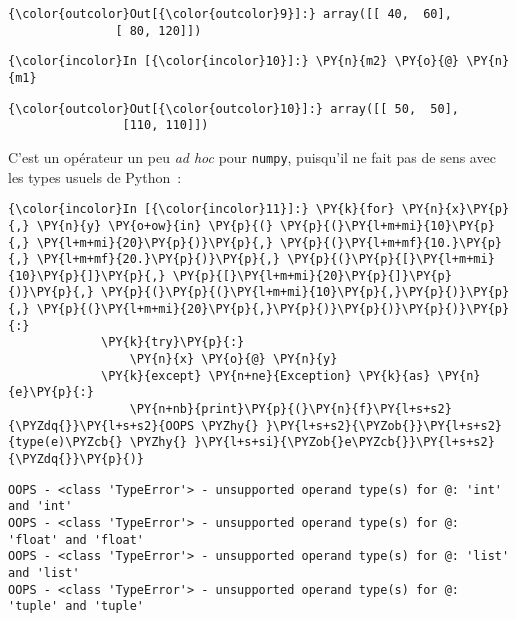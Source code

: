 \begin{Verbatim}[commandchars=\\\{\}]
{\color{outcolor}Out[{\color{outcolor}9}]:} array([[ 40,  60],
               [ 80, 120]])
\end{Verbatim}
            
    \begin{Verbatim}[commandchars=\\\{\}]
{\color{incolor}In [{\color{incolor}10}]:} \PY{n}{m2} \PY{o}{@} \PY{n}{m1}
\end{Verbatim}


\begin{Verbatim}[commandchars=\\\{\}]
{\color{outcolor}Out[{\color{outcolor}10}]:} array([[ 50,  50],
                [110, 110]])
\end{Verbatim}
            
    C'est un opérateur un peu \emph{ad hoc} pour \texttt{numpy}, puisqu'il
ne fait pas de sens avec les types usuels de Python~:

    \begin{Verbatim}[commandchars=\\\{\}]
{\color{incolor}In [{\color{incolor}11}]:} \PY{k}{for} \PY{n}{x}\PY{p}{,} \PY{n}{y} \PY{o+ow}{in} \PY{p}{(} \PY{p}{(}\PY{l+m+mi}{10}\PY{p}{,} \PY{l+m+mi}{20}\PY{p}{)}\PY{p}{,} \PY{p}{(}\PY{l+m+mf}{10.}\PY{p}{,} \PY{l+m+mf}{20.}\PY{p}{)}\PY{p}{,} \PY{p}{(}\PY{p}{[}\PY{l+m+mi}{10}\PY{p}{]}\PY{p}{,} \PY{p}{[}\PY{l+m+mi}{20}\PY{p}{]}\PY{p}{)}\PY{p}{,} \PY{p}{(}\PY{p}{(}\PY{l+m+mi}{10}\PY{p}{,}\PY{p}{)}\PY{p}{,} \PY{p}{(}\PY{l+m+mi}{20}\PY{p}{,}\PY{p}{)}\PY{p}{)}\PY{p}{)}\PY{p}{:}
             \PY{k}{try}\PY{p}{:}
                 \PY{n}{x} \PY{o}{@} \PY{n}{y}
             \PY{k}{except} \PY{n+ne}{Exception} \PY{k}{as} \PY{n}{e}\PY{p}{:}
                 \PY{n+nb}{print}\PY{p}{(}\PY{n}{f}\PY{l+s+s2}{\PYZdq{}}\PY{l+s+s2}{OOPS \PYZhy{} }\PY{l+s+s2}{\PYZob{}}\PY{l+s+s2}{type(e)\PYZcb{} \PYZhy{} }\PY{l+s+si}{\PYZob{}e\PYZcb{}}\PY{l+s+s2}{\PYZdq{}}\PY{p}{)}
\end{Verbatim}


    \begin{Verbatim}[commandchars=\\\{\}]
OOPS - <class 'TypeError'> - unsupported operand type(s) for @: 'int' and 'int'
OOPS - <class 'TypeError'> - unsupported operand type(s) for @: 'float' and 'float'
OOPS - <class 'TypeError'> - unsupported operand type(s) for @: 'list' and 'list'
OOPS - <class 'TypeError'> - unsupported operand type(s) for @: 'tuple' and 'tuple'

    \end{Verbatim}


